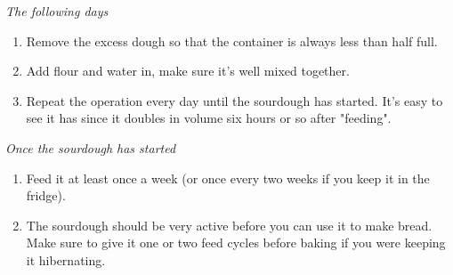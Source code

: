 \documentclass[9pt]{extarticle}
\begin{document}
\textit{The following days}
\begin{enumerate}[left=0pt,noitemsep]
    \item Remove the excess dough so that the container is always less than half full.
    \item Add flour and water in, make sure it's well mixed together.
    \item Repeat the operation every day until the sourdough has started. It's easy to see it has since it doubles in volume six hours or so after "feeding".
\end{enumerate}

\textit{Once the sourdough has started}
\begin{enumerate}[left=0pt,noitemsep]
    \item Feed it at least once a week (or once every two weeks if you keep it in the fridge).
    \item The sourdough should be very active before you can use it to make bread. Make sure to give it one or two feed cycles before baking if you were keeping it hibernating.
\end{enumerate}
\end{document}
